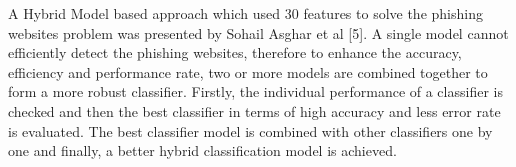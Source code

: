 \documentclass[12pt]{article}
\begin{document}
\pagestyle{fancy}
\renewcommand{\headrulewidth}{0pt}
\newpage
\noindent A Hybrid Model based approach which used 30 features to solve the phishing websites problem was presented by Sohail Asghar et al [5]. A single model cannot efficiently detect the phishing websites, therefore to enhance the accuracy, efficiency and performance rate, two or more models are combined together to form a more robust classifier. Firstly, the individual performance of a classifier is checked and then the best classifier in terms of high accuracy and less error rate is evaluated. The best classifier model is combined with other classifiers one by one and finally, a better hybrid classification model is achieved.



\pagestyle{fancy}
\renewcommand{\headrulewidth}{0pt}

\appendix
\end{document}
